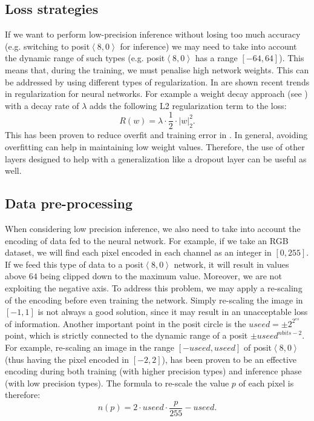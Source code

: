 \subsection{Loss strategies} If we want to perform low-precision inference without losing too much accuracy (e.g. switching to posit$\left <8,0\right>$ for inference) we may need to take into account the dynamic range of such types (e.g. posit$\left <8,0\right>$ has a range $[-64,64]$). This means that, during the training, we must penalise high network weights. This can be addressed by using different types of regularization. In \cite{kukaka2017regularization}  are shown recent trends in regularization for neural networks. For example a weight decay approach (see \cite{plaut1986experiments}) with a decay rate of $\lambda$ adds the following L2 regularization term to the loss: \[R(w) = \lambda \cdot \frac{1}{2} \cdot \left | w \right |^2_2 . \] This has been proven to reduce overfit and training error in \cite{Krizhevsky:2017:ICD:3098997.3065386}. In general, avoiding overfitting can help in maintaining low weight values. Therefore, the use of other layers designed to help with a generalization like a dropout layer \cite{JMLR:v15:srivastava14a} can be useful as well.


\subsection{Data pre-processing} When considering low precision inference, we also need to take into account the encoding of data fed to the neural network. For example, if we take an RGB dataset, we will find each pixel encoded in each channel as an integer in $[0,255]$. If we feed this type of data to a posit$\left <8,0\right>$ network, it will result in values above $64$ being clipped down to the maximum value. Moreover, we are not exploiting the negative axis. To address this problem, we may apply a re-scaling of the encoding before even training the network. Simply re-scaling the image in $[-1,1]$ is not always a good solution, since it may result in an unacceptable loss of information. Another important point in the posit circle is the $useed = \pm 2^{2^{es}}$ point, which is strictly connected to the dynamic range of a posit $\pm useed^{nbits-2}$. For example, re-scaling an image in the range $[-useed,useed]$ of posit$\left <8,0\right>$ (thus having the pixel encoded in $[-2,2]$), has been proven to be an effective encoding during both training (with higher precision types) and inference phase (with low precision types). The formula to re-scale the value $p$ of each pixel is therefore: \[ n(p) = 2\cdot useed \cdot \frac{p}{255} - useed. \]

